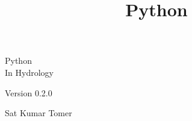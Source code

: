 \documentclass[10pt]{book}
\title{Python}
\newcommand{\theversion}{0.2.0}
\begin{document}

\frontmatter




\newtheorem{ex}{Exercise}[chapter]

\begin{latexonly}

\renewcommand{\blankpage}{\thispagestyle{empty} \quad \newpage}



\thispagestyle{empty}

\begin{flushright}
\vspace*{2.0in}


\vspace{0.25in}


\vfill

\end{flushright}


\blankpage

\pagebreak
\thispagestyle{empty}

\begin{flushright}
\vspace*{2.0in}

\begin{spacing}{3}
{\Huge Python}\\
{\large In Hydrology}
\end{spacing}

\vspace{0.25in}

Version \theversion

\vspace{1in}


{\huge Sat Kumar Tomer } \vspace{0.15in} \\ 




\end{flushright}
\end{latexonly}
\end{document}
